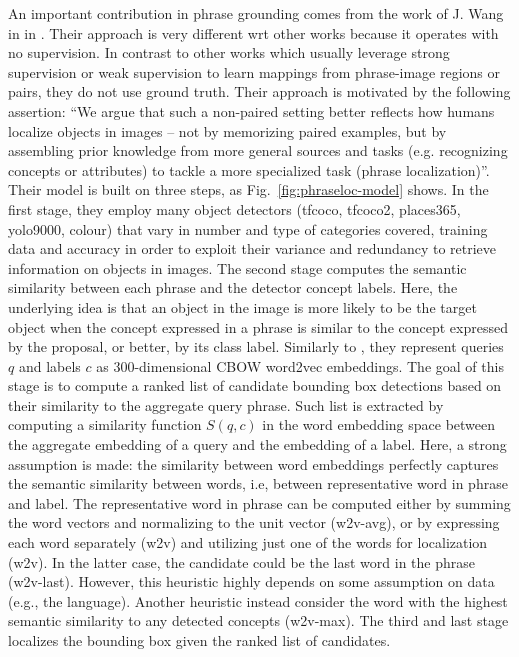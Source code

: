 An important contribution in phrase grounding comes from the work of
J. Wang in \etal{} in \cite{wang2019phrase}. Their approach is very
different wrt other works because it operates with no supervision. In
contrast to other works which usually leverage strong supervision or
weak supervision to learn mappings from phrase-image regions or pairs,
they do not use ground truth. Their approach is motivated by the
following assertion: ``We argue that such a non-paired setting better
reflects how humans localize objects in images -- not by memorizing
paired examples, but by assembling prior knowledge from more general
sources and tasks (e.g. recognizing concepts or attributes) to tackle
a more specialized task (phrase localization)''. Their model is built
on three steps, as Fig.~\ref{fig:phraseloc-model} shows. In the first
stage, they employ many object detectors (tfcoco, tfcoco2, places365,
yolo9000, colour) that vary in number and type of categories covered,
training data and accuracy in order to exploit their variance and
redundancy to retrieve information on objects in images. The second
stage computes the semantic similarity between each phrase and the
detector concept labels. Here, the underlying idea is that an object
in the image is more likely to be the target object when the concept
expressed in a phrase is similar to the concept expressed by the
proposal, or better, by its class label. Similarly to
\cite{chen2018knowledge}, they represent queries $q$ and labels $c$ as
$300$-dimensional CBOW word2vec embeddings. The goal of this stage is
to compute a ranked list of candidate bounding box detections based on
their similarity to the aggregate query phrase. Such list is extracted
by computing a similarity function $S(q, c)$ in the word embedding
space between the aggregate embedding of a query and the embedding of
a label. Here, a strong assumption is made: the similarity between
word embeddings perfectly captures the semantic similarity between
words, i.e, between representative word in phrase and label. The
representative word in phrase can be computed either by summing the
word vectors and normalizing to the unit vector (w2v-avg), or by
expressing each word separately (w2v) and utilizing just one of the
words for localization (w2v). In the latter case, the candidate could
be the last word in the phrase (w2v-last). However, this heuristic
highly depends on some assumption on data (e.g., the language).
Another heuristic instead consider the word with the highest semantic
similarity to any detected concepts (w2v-max). The third and last
stage localizes the bounding box given the ranked list of candidates.
